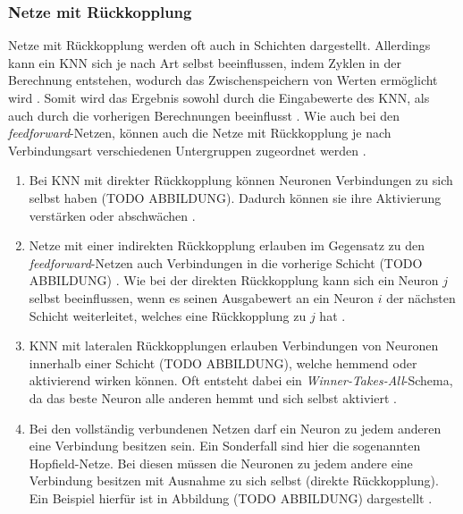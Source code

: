 \subsubsection{Netze mit Rückkopplung}
Netze mit Rückkopplung werden oft auch in Schichten dargestellt. Allerdings kann ein \ac{KNN} sich je nach Art selbst beeinflussen, indem Zyklen in der Berechnung entstehen, wodurch das Zwischenspeichern von Werten ermöglicht wird \cite{russell2013kunstliche}. Somit wird das Ergebnis sowohl durch die Eingabewerte des \ac{KNN}, als auch durch die vorherigen Berechnungen beeinflusst \cite{lin1998embedded}. Wie auch bei den \emph{feedforward}-Netzen, können auch die Netze mit Rückkopplung je nach Verbindungsart verschiedenen Untergruppen zugeordnet werden \cite{zell2003simulation}.\\
\begin{enumerate} %
	\item Bei \ac{KNN} mit direkter Rückkopplung können Neuronen Verbindungen zu sich selbst haben (TODO ABBILDUNG). Dadurch können sie ihre Aktivierung verstärken oder abschwächen \cite{zell2003simulation}.
	\item Netze mit einer indirekten Rückkopplung erlauben im Gegensatz zu den \emph{feedforward}-Netzen auch Verbindungen in die vorherige Schicht (TODO ABBILDUNG) \cite{zell2003simulation}. Wie bei der direkten Rückkopplung kann sich ein Neuron $j$ selbst beeinflussen, wenn es seinen Ausgabewert an ein Neuron $i$ der nächsten Schicht weiterleitet, welches eine Rückkopplung zu $j$ hat \cite{kriesel2008kleiner}.
	\item \ac{KNN} mit lateralen Rückkopplungen erlauben Verbindungen von Neuronen innerhalb einer Schicht (TODO ABBILDUNG), welche hemmend oder aktivierend wirken können. Oft entsteht dabei ein \emph{Winner-Takes-All}-Schema, da das beste Neuron alle anderen hemmt und sich selbst aktiviert \cite{kriesel2008kleiner}.
	\item Bei den vollständig verbundenen Netzen darf ein Neuron zu jedem anderen eine Verbindung besitzen sein. Ein Sonderfall sind hier die sogenannten  Hopfield-Netze. Bei diesen müssen die Neuronen zu jedem andere eine Verbindung besitzen mit Ausnahme zu sich selbst (direkte Rückkopplung). Ein Beispiel hierfür ist in Abbildung (TODO ABBILDUNG) dargestellt \cite{kriesel2008kleiner}.  
\end{enumerate}


